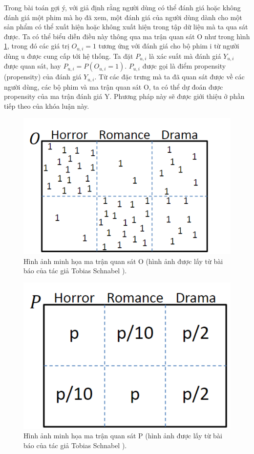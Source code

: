 Trong bài toán gợi ý, với giả định rằng người dùng có thể đánh giá hoặc không đánh giá một phim mà họ đã xem, một đánh giá của người dùng dành cho một sản phẩm có thể xuất hiện hoặc không xuất hiện trong tập dữ liệu mà ta qua sát được. Ta có thể biểu diễn điều này thông qua ma trận quan sát O như trong hình \ref{fig:3.1_O}, trong đó các giá trị $O_{u,i}=1$ tương ứng với đánh giá cho bộ phim i từ người dùng u được cung cấp tới hệ thống. Ta đặt $P_{u,i}$ là xác suất mà đánh giá $Y_{u,i}$ được quan sát, hay  $P_{u,i} = P(O_{u,i} = 1)$.  $P_{u,i}$ được gọi là điểm propensity (propensity) của đánh giá  $Y_{u,i}$. Từ các đặc trưng mà ta đã quan sát được về các người dùng, các bộ phim và ma trận quan sát O, ta có thể dự đoán được propensity của ma trận đánh giá Y. Phương pháp này sẽ được giới thiệu ở phần tiếp theo của khóa luận này.


\begin{figure}[h]
    \centering
    \includegraphics[width=\textwidth]{images/Chapter3/O.png}
    \caption{Hình ảnh minh họa ma trận quan sát O (hình ảnh được lấy từ bài báo của tác giả Tobias Schnabel \cite{IPS}).}
    \label{fig:3.1_O}
\end{figure}

\begin{figure}[h]
    \centering
    \includegraphics[width=\textwidth]{images/Chapter3/P.png}
    \caption{Hình ảnh minh họa ma trận quan sát P (hình ảnh được lấy từ bài báo của tác giả Tobias Schnabel \cite{IPS}).}
    \label{fig:3.1_P}
\end{figure}


